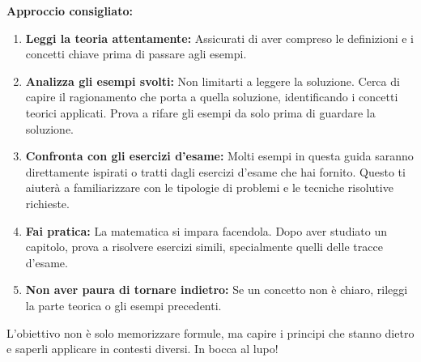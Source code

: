 \textbf{Approccio consigliato:}
\begin{enumerate}
    \item \textbf{Leggi la teoria attentamente:} Assicurati di aver compreso le definizioni e i concetti chiave prima di passare agli esempi.
    \item \textbf{Analizza gli esempi svolti:} Non limitarti a leggere la soluzione. Cerca di capire il ragionamento che porta a quella soluzione, identificando i concetti teorici applicati. Prova a rifare gli esempi da solo prima di guardare la soluzione.
    \item \textbf{Confronta con gli esercizi d'esame:} Molti esempi in questa guida saranno direttamente ispirati o tratti dagli esercizi d'esame che hai fornito. Questo ti aiuterà a familiarizzare con le tipologie di problemi e le tecniche risolutive richieste.
    \item \textbf{Fai pratica:} La matematica si impara facendola. Dopo aver studiato un capitolo, prova a risolvere esercizi simili, specialmente quelli delle tracce d'esame.
    \item \textbf{Non aver paura di tornare indietro:} Se un concetto non è chiaro, rileggi la parte teorica o gli esempi precedenti.
\end{enumerate}
L'obiettivo non è solo memorizzare formule, ma capire i principi che stanno dietro e saperli applicare in contesti diversi. In bocca al lupo!


